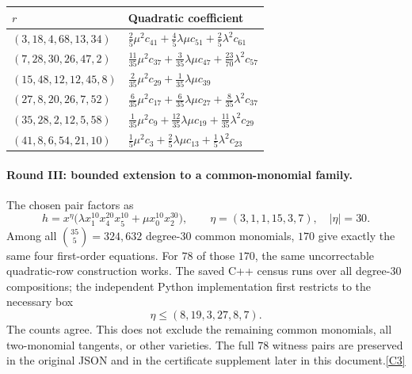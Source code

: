 \documentclass[11pt]{article}
\newcommand{\src}[1]{\hyperlink{src:#1}{[#1]}}
\begin{document}
\begin{longtable}{@{}p{}p{}@{}}
\toprule
$r$ & Quadratic coefficient\\
\midrule
\endhead
$(3,18,4,68,13,34)$ & $\frac{2}{5}\mu^2{}c_{41}+\frac{4}{5}\lambda\mu{}c_{51}+\frac{2}{5}\lambda^2{}c_{61}$\\
$(7,28,30,26,47,2)$ & $\frac{11}{35}\mu^2{}c_{37}+\frac{3}{35}\lambda\mu{}c_{47}+\frac{23}{70}\lambda^2{}c_{57}$\\
$(15,48,12,12,45,8)$ & $\frac{2}{35}\mu^2{}c_{29}+\frac{1}{35}\lambda\mu{}c_{39}$\\
$(27,8,20,26,7,52)$ & $\frac{6}{35}\mu^2{}c_{17}+\frac{6}{35}\lambda\mu{}c_{27}+\frac{8}{35}\lambda^2{}c_{37}$\\
$(35,28,2,12,5,58)$ & $\frac{1}{35}\mu^2{}c_{9}+\frac{12}{35}\lambda\mu{}c_{19}+\frac{11}{35}\lambda^2{}c_{29}$\\
$(41,8,6,54,21,10)$ & $\frac{1}{5}\mu^2{}c_{3}+\frac{2}{5}\lambda\mu{}c_{13}+\frac{1}{5}\lambda^2{}c_{23}$\\
\bottomrule
\end{longtable}

\paragraph{Round III: bounded extension to a common-monomial family.}
The chosen pair factors as
\[
 h=x^\eta\bigl(\lambda x_1^{10}x_4^{20}x_5^{10}
                   +\mu x_0^{10}x_2^{30}\bigr),
 \qquad\eta=(3,1,1,15,3,7),\quad|\eta|=30.
\]
Among all $\binom{35}{5}=324,632$ degree-$30$ common monomials, $170$ give
exactly the same four first-order equations. For $78$ of those $170$, the
same uncorrectable quadratic-row construction works. The saved C++ census
runs over all degree-$30$ compositions; the independent Python implementation
first restricts to the necessary box
\[
 \eta\le(8,19,3,27,8,7).
\]
The counts agree. This does not exclude the remaining common monomials, all
two-monomial tangents, or other varieties. The full $78$ witness pairs are
preserved in the original JSON and in the certificate supplement later in
this document.\src{C3}
\end{document}
